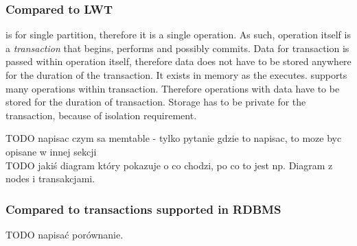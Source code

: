 \subsubsection{Compared to LWT}
\lwt is for single partition, therefore it is a single operation. As such, operation itself is a \emph{transaction} that begins, performs and possibly commits. Data for \lwt transaction is passed within operation itself, therefore data does not have to be stored anywhere for the duration of the transaction. It exists in memory as the \lwt executes.
\mpt supports many operations within transaction. Therefore operations with data have to be stored for the duration of transaction. Storage has to be private for the transaction, because of isolation requirement.



TODO napisac czym sa memtable - tylko pytanie gdzie to napisac, to moze byc opisane w innej sekcji \\






TODO jakiś diagram który pokazuje o co chodzi, po co to jest np. Diagram z nodes i transakcjami.

\subsubsection{Compared to transactions supported in RDBMS}
TODO napisać porównanie.
